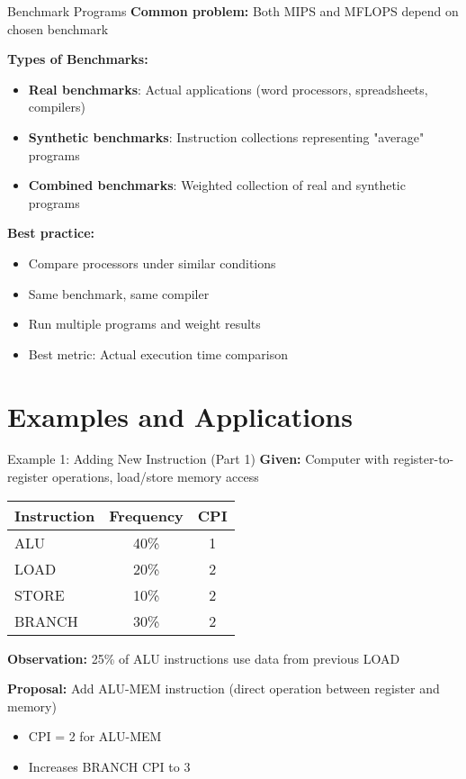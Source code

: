 \documentclass[aspectratio=169,12pt]{beamer}
\begin{document}
\begin{frame}{Benchmark Programs}
\textbf{Common problem:} Both MIPS and MFLOPS depend on chosen benchmark

\vspace{0.5em}
\textbf{Types of Benchmarks:}
\begin{itemize}
    \item \textbf{Real benchmarks}: Actual applications (word processors, spreadsheets, compilers)
    \item \textbf{Synthetic benchmarks}: Instruction collections representing "average" programs
    \item \textbf{Combined benchmarks}: Weighted collection of real and synthetic programs
\end{itemize}

\vspace{0.5em}
\textbf{Best practice:}
\begin{itemize}
    \item Compare processors under similar conditions
    \item Same benchmark, same compiler
    \item Run multiple programs and weight results
    \item Best metric: Actual execution time comparison
\end{itemize}
\end{frame}

\section{Examples and Applications}
\begin{frame}{Example 1: Adding New Instruction (Part 1)}
\textbf{Given:} Computer with register-to-register operations, load/store memory access

\begin{table}[h]
\centering
\begin{tabular}{lcc}
\toprule
Instruction & Frequency & CPI \\
\midrule
ALU & 40\% & 1 \\
LOAD & 20\% & 2 \\
STORE & 10\% & 2 \\
BRANCH & 30\% & 2 \\
\bottomrule
\end{tabular}
\end{table}

\textbf{Observation:} 25\% of ALU instructions use data from previous LOAD

\textbf{Proposal:} Add ALU-MEM instruction (direct operation between register and memory)
\begin{itemize}
    \item CPI = 2 for ALU-MEM
    \item Increases BRANCH CPI to 3
\end{itemize}
\end{frame}
\end{document}
